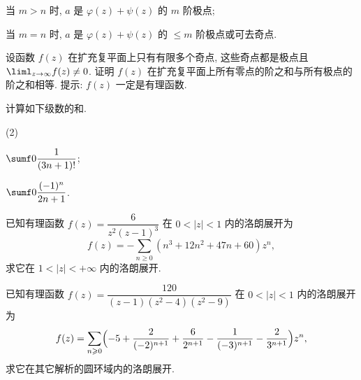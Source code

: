 \begin{homework}
\begin{homework}
      \begin{subhomework}
        \item 当 $m>n$ 时, $a$ 是 $\varphi(z)+\psi(z)$ 的 $m$ 阶极点;
        \item 当 $m=n$ 时, $a$ 是 $\varphi(z)+\psi(z)$ 的 $\le m$ 阶极点或可去奇点.
      \end{subhomework}
    \item 设函数 $f(z)$ 在扩充复平面上只有有限多个奇点, 这些奇点都是极点且 $\liml_{z\ra\infty}f(z)\neq0$.
      证明 $f(z)$ 在扩充复平面上所有零点的阶之和与所有极点的阶之和相等. 提示: $f(z)$ 一定是有理函数.
    \item \optionalex 计算如下级数的和.
    \begin{subhomework}(2)
      \item $\sumf0 \dfrac1{(3n+1)!}$;
      \item $\sumf0 \dfrac{(-1)^n}{2n+1}$.
    \end{subhomework}
    \item \optionalex 已知有理函数 $f(z)=\dfrac{6}{z^2(z-1)^3}$ 在 $0<|z|<1$ 内的洛朗展开为
      \[
        f(z)=-\sum_{n\ge 0}(n^3+12n^2+47n+60)z^n,
      \]
      求它在 $1<|z|<+\infty$ 内的洛朗展开.
    \item \optionalex 已知有理函数 $f(z)=\dfrac{120}{(z-1)(z^2-4)(z^2-9)}$ 在 $0<|z|<1$ 内的洛朗展开为
      \[
        f(z)=\sum_{n\ge 0}\Bigl(-5+\frac2{(-2)^{n+1}}+\frac6{2^{n+1}}-\frac1{(-3)^{n+1}}-\frac2{3^{n+1}}\Bigr)z^n,
      \]
      求它在其它解析的圆环域内的洛朗展开.
  \end{homework}
\end{homework}

% 
% 
% 

